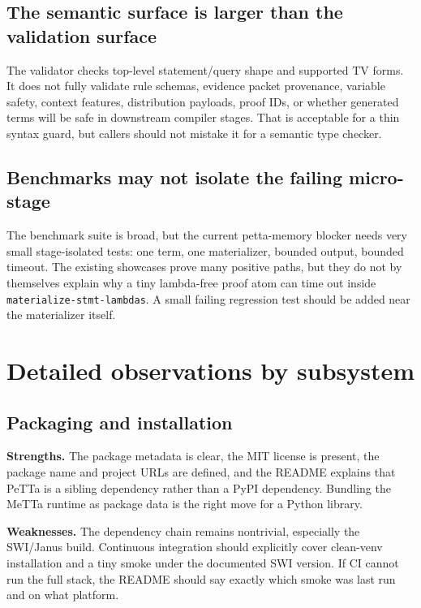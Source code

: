 \documentclass[11pt]{article}
\newcommand{\code}[1]{\texttt{#1}}
\begin{document}
\subsection{The semantic surface is larger than the validation surface}

The validator checks top-level statement/query shape and supported TV forms.  It
does not fully validate rule schemas, evidence packet provenance, variable
safety, context features, distribution payloads, proof IDs, or whether generated
terms will be safe in downstream compiler stages.  That is acceptable for a thin
syntax guard, but callers should not mistake it for a semantic type checker.

\subsection{Benchmarks may not isolate the failing micro-stage}

The benchmark suite is broad, but the current petta-memory blocker needs very
small stage-isolated tests: one term, one materializer, bounded output, bounded
timeout.  The existing showcases prove many positive paths, but they do not by
themselves explain why a tiny lambda-free proof atom can time out inside
\code{materialize-stmt-lambdas}.  A small failing regression test should be added
near the materializer itself.

\section{Detailed observations by subsystem}

\subsection{Packaging and installation}

\textbf{Strengths.}  The package metadata is clear, the MIT license is present,
the package name and project URLs are defined, and the README explains that
PeTTa is a sibling dependency rather than a PyPI dependency.  Bundling the MeTTa
runtime as package data is the right move for a Python library.

\textbf{Weaknesses.}  The dependency chain remains nontrivial, especially the
SWI/Janus build.  Continuous integration should explicitly cover clean-venv
installation and a tiny smoke under the documented SWI version.  If CI cannot
run the full stack, the README should say exactly which smoke was last run and
on what platform.
\end{document}
